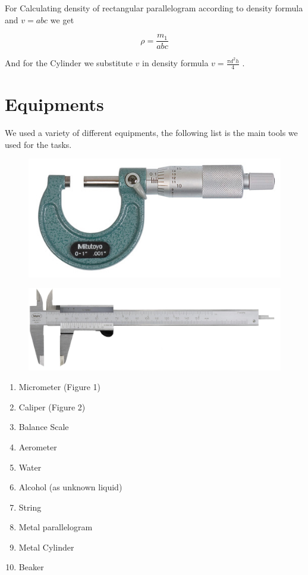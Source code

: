 \documentclass[a4paper, 12pt]{article}
\begin{document}
For Calculating density of rectangular parallelogram according to density formula and \(v=abc\) we get

\[\rho = \frac{m_{1}}{abc} \]


And for the Cylinder we substitute \(v\) in density formula \(v = \frac{\pi d^{2} h}{4} \) .






\section{Equipments}

We used a variety of different equipments, the following list is the main tools we used for the tasks.

\begin{figure}
	\centering
	\begin{minipage}{.5\textwidth}
		\centering
		\includegraphics[width=.4\linewidth]{micrometer.jpg}
		\label{fig:test1}
	\end{minipage}%
	\begin{minipage}{.5\textwidth}
		\centering
		\includegraphics[width=.4\linewidth]{caliper.jpg}
		\label{fig:test2}
	\end{minipage}
\end{figure}

\begin{enumerate}
	\item Micrometer (Figure 1)
	\item Caliper (Figure 2)
	\item Balance Scale
	\item Aerometer
	\item Water
	\item Alcohol (as unknown liquid)
	\item String
	\item Metal parallelogram
	\item Metal Cylinder
	\item Beaker
\end{enumerate}
\end{document}
